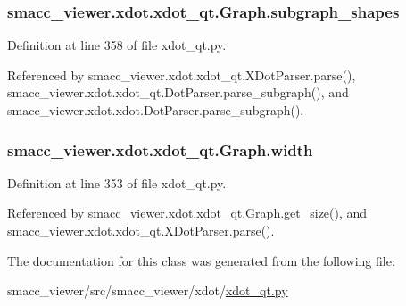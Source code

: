 \subsubsection[{\texorpdfstring{subgraph\+\_\+shapes}{subgraph_shapes}}]{\setlength{\rightskip}{0pt plus 5cm}smacc\+\_\+viewer.\+xdot.\+xdot\+\_\+qt.\+Graph.\+subgraph\+\_\+shapes}\hypertarget{classsmacc__viewer_1_1xdot_1_1xdot__qt_1_1Graph_a8470442e6098163b766e6c8a1326c7b6}{}\label{classsmacc__viewer_1_1xdot_1_1xdot__qt_1_1Graph_a8470442e6098163b766e6c8a1326c7b6}


Definition at line 358 of file xdot\+\_\+qt.\+py.



Referenced by smacc\+\_\+viewer.\+xdot.\+xdot\+\_\+qt.\+X\+Dot\+Parser.\+parse(), smacc\+\_\+viewer.\+xdot.\+xdot\+\_\+qt.\+Dot\+Parser.\+parse\+\_\+subgraph(), and smacc\+\_\+viewer.\+xdot.\+xdot.\+Dot\+Parser.\+parse\+\_\+subgraph().

\subsubsection[{\texorpdfstring{width}{width}}]{\setlength{\rightskip}{0pt plus 5cm}smacc\+\_\+viewer.\+xdot.\+xdot\+\_\+qt.\+Graph.\+width}\hypertarget{classsmacc__viewer_1_1xdot_1_1xdot__qt_1_1Graph_a7bdb10b7732ab166ccf02997593e0a99}{}\label{classsmacc__viewer_1_1xdot_1_1xdot__qt_1_1Graph_a7bdb10b7732ab166ccf02997593e0a99}


Definition at line 353 of file xdot\+\_\+qt.\+py.



Referenced by smacc\+\_\+viewer.\+xdot.\+xdot\+\_\+qt.\+Graph.\+get\+\_\+size(), and smacc\+\_\+viewer.\+xdot.\+xdot\+\_\+qt.\+X\+Dot\+Parser.\+parse().



The documentation for this class was generated from the following file\+:\begin{DoxyCompactItemize}
\item 
smacc\+\_\+viewer/src/smacc\+\_\+viewer/xdot/\hyperlink{xdot__qt_8py}{xdot\+\_\+qt.\+py}\end{DoxyCompactItemize}
